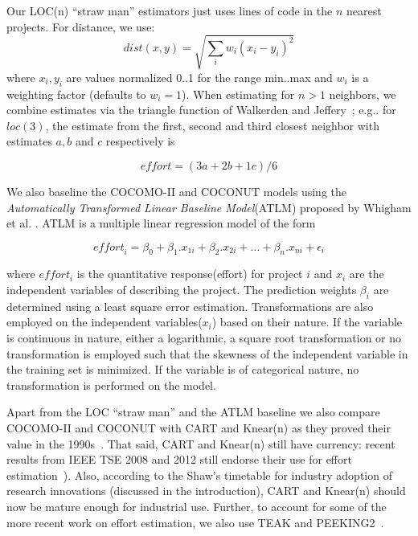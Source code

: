 \documentclass[smallcondesed]{svjour3}
\newenvironment{BLUE}{\color{black}}{\ignorespacesafterend}
\newcommand{\HERE}[1]{}
\begin{document}
Our LOC(n) ``straw man'' 
estimators just uses  lines of code
in the $n$ nearest projects. For distance,
we use:
\begin{equation}\label{eq:dist}
\mathit{dist}(x,y) = \sqrt{\sum_i w_i (x_i-y_i)^2}
\end{equation} 
where $x_i,y_i$ 
are values normalized 0..1 for the range min..max
and $w_i$ is a weighting factor (defaults to $w_i=1$).
When  estimating for $n>1$ neighbors,
we combine estimates via the triangle 
function of  Walkerden
and Jeffery~\cite{Walkerden1999}; 
e.g.. for $loc(3)$, the  estimate
from the first, second and third closest neighbor with estimates
$a,b$ and $c$ respectively is
\HERE{Reviewer1c}
\begin{equation}\label{eq:tri}
\mathit{effort} = (3a + 2b + 1c)/6
\end{equation}

\begin{BLUE}
  \HERE{Reviewer2c}
We also baseline the COCOMO-II and COCONUT models using the \textit{Automatically Transformed Linear Baseline Model}(ATLM) proposed by Whigham et al. \cite{whigham15}. ATLM is a multiple linear regression model of the form

\begin{equation}
    \label{eq:atlm}
    \mathit{effort}_i = \beta_0 + \beta_1.x_{1i} + \beta_2.x_{2i} + \ldots + \beta_n.x_{ni} + \epsilon_i
\end{equation}

where $effort_i$ is the quantitative response(effort) for project $i$ and $x_i$ are the independent variables of describing the project. The prediction weights $\beta_i$ are determined using a least square error estimation. Transformations are also employed on the independent variables($x_i$) based on their nature. If the variable is continuous in nature, either a logarithmic, a square root transformation or no transformation is employed such that the skewness of the independent variable in the training set is minimized. If the variable is of categorical nature, no transformation is performed on the model.

\end{BLUE}

Apart from the LOC ``straw man'' and the ATLM baseline
we also compare COCOMO-II and COCONUT with CART
and Knear(n) as they proved their value  in the 1990s~\cite{shepperd97,Walkerden1999}. That said, CART and Knear(n)
still have currency: 
recent results from IEEE TSE 2008 and 2012 still endorse their  use for effort estimation~\cite{dejaeger12,koc11a,keung2008b}).
Also, according to the Shaw's timetable for industry adoption of research innovations
(discussed in the introduction),  CART and Knear(n) should now be mature enough for industrial use.
Further, to account for some of the more recent work on effort estimation, we also use TEAK and PEEKING2~\cite{koc11b,papa13}.
\end{document}
